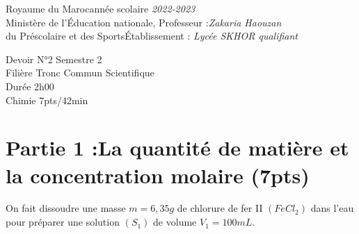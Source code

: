 \documentclass[12pt]{article}
\newcommand\headerMe[2]{\noindent{}#1\hfill#2}
\begin{document}
\headerMe{Royaume du Maroc}{année scolaire \emph{2022-2023}}\\
\headerMe{Ministère de l'Éducation nationale, }{  Professeur :\emph{Zakaria Haouzan}}\\
\headerMe{du Préscolaire et des Sports}{Établissement : \emph{Lycée SKHOR qualifiant}}\\

\begin{center}
Devoir  N°2 Semestre 2 \\
   Filière Tronc Commun Scientifique\\
Durée 2h00
\\
    \vspace{.2cm}
\hrulefill
\Large{Chimie 7pts/42min}
\hrulefill\\

\end{center}
 \section*{Partie 1 :La quantité de matière et la concentration molaire \dotfill (7pts) }
On fait dissoudre une masse $m = 6,35 g$ de chlorure de fer II $(FeCl_2)$ dans l’eau pour préparer une solution $(S_1)$ de volume $V_1 = 100 mL$.
\end{document}
